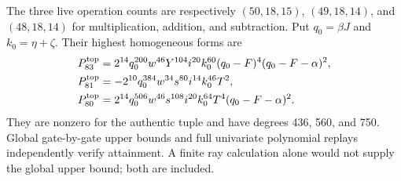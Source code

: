 The three live operation counts are respectively
$(50,18,15)$, $(49,18,14)$, and $(48,18,14)$ for multiplication,
addition, and subtraction. Put $q_0=\beta J$ and $k_0=\eta+\zeta$.
Their highest homogeneous forms are
\begin{align*}
 P_{83}^{\rm top}&=2^{14}q_0^{200}w^{46}Y^{104}i^{20}k_0^{60}
                  (q_0-F)^4(q_0-F-\alpha)^2,\\
 P_{81}^{\rm top}&=-2^{10}q_0^{384}w^{34}s^{80}i^{14}k_0^{46}T^2,\\
 P_{80}^{\rm top}&=2^{14}q_0^{506}w^{46}s^{108}i^{20}k_0^{64}T^4
                  (q_0-F-\alpha)^2.
\end{align*}
They are nonzero for the authentic tuple and have degrees 436, 560,
and 750. Global gate-by-gate upper bounds and full univariate polynomial
replays independently verify attainment. A finite ray calculation alone
would not supply the global upper bound; both are included.

